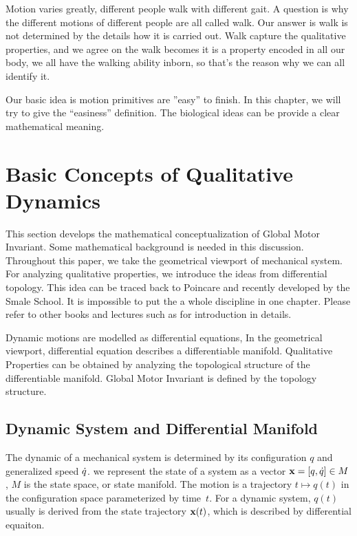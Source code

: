\ifpdf
    \graphicspath{{GlobalInvariant/GlobalInvariantFigs/PNG/}{GlobalInvariant/GlobalInvariantFigs/PDF/}{GlobalInvariant/GlobalInvariantFigs/}}
\else
    \graphicspath{{GlobalInvariant/GlobalInvariantFigs/EPS/}{GlobalInvariant/GlobalInvariantFigs/}}
\fi

Motion varies greatly, different people walk with different gait. 
A question is why the different motions of different people are all called walk.
Our answer is walk is not determined by the details how it is carried out.
Walk capture the qualitative properties, and we agree on the walk becomes it is a property encoded in all our body, we all have the walking ability inborn, so that’s the reason why we can all identify it.


Our basic idea is motion primitives are ''easy'' to finish. 
In this chapter, we will try to give the “easiness” definition.
The biological ideas can be provide a clear mathematical meaning.


\section{Basic Concepts of Qualitative Dynamics}
This section develops the mathematical conceptualization of Global Motor Invariant.
Some mathematical background is needed in this discussion.
Throughout this paper, we take the geometrical viewport of mechanical system.
For analyzing qualitative properties, we introduce the ideas from differential topology.
This idea can be traced back to Poincare\citep{Poincar'e1899,Poincar'e1885} and recently developed by the Smale School\citep{Smale1970}.
It is impossible to put the a whole discipline in one chapter.
Please refer to other books and lectures such as \citep{abraham1978foundations}for introduction in details.


Dynamic motions are modelled as differential equations,
In the geometrical viewport, differential equation describes a differentiable manifold.
Qualitative Properties can be obtained by analyzing the topological structure of the differentiable manifold.
Global Motor Invariant is defined by the topology structure.



\subsection{Dynamic System and Differential Manifold}



The dynamic of a mechanical system is determined by its configuration  $q$ and generalized speed $\dot{q}$. 
we represent the state of a system as a vector $\mathbf{x}=[q,\dot{q}] \in M$,  $M$ is the state space, or state manifold.
The motion is a trajectory $t \mapsto q(t)$ in the configuration space parameterized by time~$t$.
For a dynamic system, $q(t)$ usually is derived from the state trajectory $\mathbf{x}(t)$, which is described by differential equaiton. 


